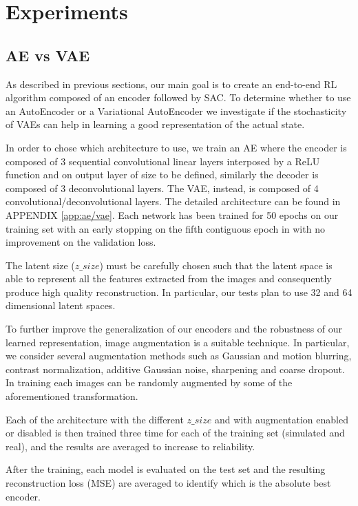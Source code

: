 \chapter{Experiments}

\section{AE vs VAE}

As described in previous sections, our main goal is to create an end-to-end RL algorithm composed of an encoder followed by SAC. To determine whether to use an AutoEncoder or a Variational AutoEncoder we investigate if the stochasticity of VAEs can help in learning a good representation of the actual state. 

In order to chose which architecture to use, we train an AE where the encoder is composed of 3 sequential convolutional linear layers interposed by a ReLU function and on output layer of size to be defined, similarly the decoder is composed of 3 deconvolutional layers. The VAE, instead, is composed of 4 convolutional/deconvolutional layers. The detailed architecture can be found in APPENDIX \ref{app:ae/vae}. Each network has been trained for 50 epochs on our training set with an early stopping on the fifth contiguous epoch in with no improvement on the validation loss.

The latent size ($z\_size$) must be carefully chosen such that the latent space is able to represent all the features extracted from the images and consequently produce high quality reconstruction. In particular, our tests plan to use 32 and 64 dimensional latent spaces. 

To further improve the generalization of our encoders and the robustness of our learned representation, image augmentation is a suitable technique. In particular, we consider several augmentation methods such as Gaussian and motion blurring, contrast normalization, additive Gaussian noise, sharpening and coarse dropout. In training each images can be randomly augmented by some of the aforementioned transformation. 

Each of the architecture with the different $z\_size$ and with augmentation enabled or disabled is then trained three time for each of the training set (simulated and real), and the results are averaged to increase to reliability. 

After the training, each model is evaluated on the test set and the resulting reconstruction loss (MSE) are averaged to identify which is the absolute best encoder. 

